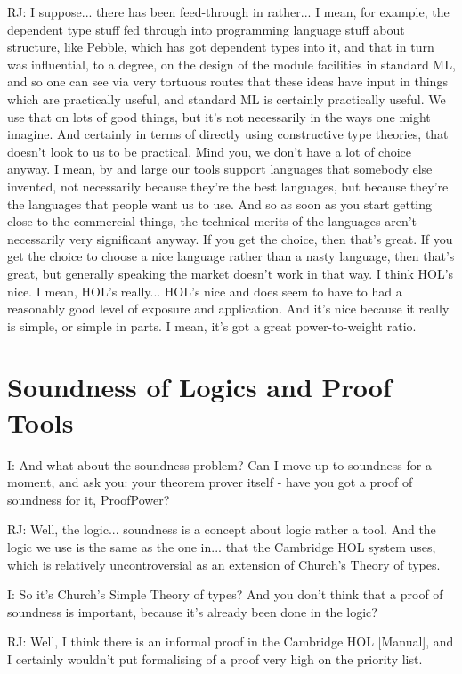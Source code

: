 \documentclass[10pt,titlepage]{book}
\begin{document}
RJ: I suppose... there has been feed-through in rather... I mean, for example, the dependent type stuff fed through into programming language stuff about structure, like Pebble, which has got dependent types into it, and that in turn was influential, to a degree, on the design of the module facilities in standard ML, and so one can see via very tortuous routes that these ideas have input in things which are practically useful, and standard ML is certainly practically useful.
We use that on lots of good things, but it's not necessarily in the ways one might imagine.
And certainly in terms of directly using constructive type theories, that doesn't look to us to be practical.
Mind you, we don't have a lot of choice anyway.
I mean, by and large our tools support languages that somebody else invented, not necessarily because they're the best languages, but because they're the languages that people want us to use.
And so as soon as you start getting close to the commercial things, the technical merits of the languages aren't necessarily very significant anyway.
If you get the choice, then that's great.
If you get the choice to choose a nice language rather than a nasty language, then that's great, but generally speaking the market doesn't work in that way.
I think HOL's nice.
I mean, HOL's really... HOL's nice and does seem to have to had a reasonably good level of exposure and application.
And it's nice because it really is simple, or simple in parts.
I mean, it's got a great power-to-weight ratio.

\section{Soundness of Logics and Proof Tools}

I: And what about the soundness problem?
Can I move up to soundness for a moment, and ask you: your theorem prover itself - have you got a proof of soundness for it, ProofPower?

RJ: Well, the logic... soundness is a concept about logic rather a tool.
And the logic we use is the same as the one in... that the Cambridge HOL system uses, which is relatively uncontroversial as an extension of Church's Theory of types.

I: So it's Church's Simple Theory of types?
And you don't think that a proof of soundness is important, because it's already been done in the logic?

RJ: Well, I think there is an informal proof in the Cambridge HOL [Manual], and I certainly wouldn't put formalising of a proof very high on the priority list.
\end{document}
